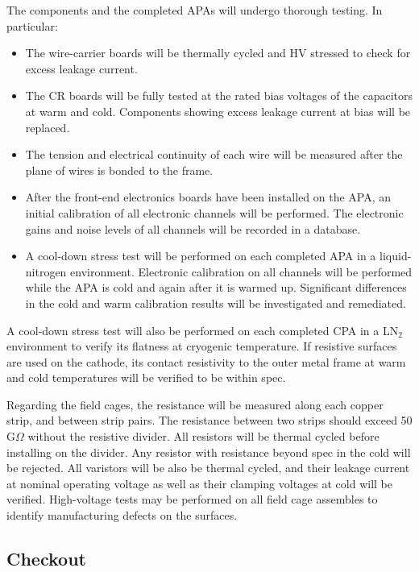 The components and the completed APAs will undergo thorough testing. In particular:
\begin{itemize}

\item The wire-carrier boards will be thermally cycled and HV stressed to check for excess leakage current.
\item The CR boards will be fully tested at the rated bias voltages of the capacitors at warm and cold.  Components showing excess leakage current at bias will be replaced.
\item The tension and electrical continuity of each wire will be 
measured after the plane of wires is bonded to the frame.
\item After the front-end electronics boards have been installed on 
the APA, an initial calibration of all electronic channels will be 
performed.  The electronic gains and noise levels of all channels will be 
recorded in a database.
\item A cool-down stress test will be performed on each completed 
APA in a liquid-nitrogen environment.  Electronic calibration on 
all channels will be performed while the APA is cold and again
after it is warmed up.  Significant differences in the cold and warm calibration 
results will be investigated and remediated.  
\end{itemize}

A cool-down stress test will also be performed on each completed 
CPA in a LN$_2$ environment to verify its flatness at cryogenic temperature. If resistive surfaces are used on the cathode, its contact resistivity to the outer metal frame at warm and cold temperatures will be verified to be within spec. 

Regarding the field cages,  the resistance will be measured along each copper strip,  
and between strip pairs.  The resistance between two 
strips should exceed 50 G$\Omega$ without the resistive divider.  All resistors will be thermal cycled before installing on the divider.  Any resistor with resistance beyond spec in the cold will be rejected. All varistors will be also be thermal cycled, and their leakage current at nominal operating voltage as well as their clamping voltages at cold will be verified.  High-voltage tests may be performed on all field cage assembles to identify manufacturing defects on the surfaces. 

\subsection{Checkout } 
\label{sec:v5-tpc-checkout-checkout}

